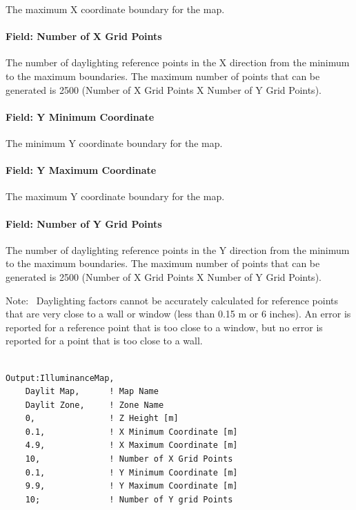 The maximum X coordinate boundary for the map.

\paragraph{Field: Number of X Grid Points}\label{field-number-of-x-grid-points}

The number of daylighting reference points in the X direction from the minimum to the maximum boundaries. The maximum number of points that can be generated is 2500 (Number of X Grid Points X Number of Y Grid Points).

\paragraph{Field: Y Minimum Coordinate}\label{field-y-minimum-coordinate}

The minimum Y coordinate boundary for the map.

\paragraph{Field: Y Maximum Coordinate}\label{field-y-maximum-coordinate}

The maximum Y coordinate boundary for the map.

\paragraph{Field: Number of Y Grid Points}\label{field-number-of-y-grid-points}

The number of daylighting reference points in the Y direction from the minimum to the maximum boundaries. The maximum number of points that can be generated is 2500 (Number of X Grid Points X Number of Y Grid Points).

Note:~ Daylighting factors cannot be accurately calculated for reference points that are very close to a wall or window (less than 0.15 m or 6 inches). An error is reported for a reference point that is too close to a window, but no error is reported for a point that is too close to a wall.

\begin{lstlisting}

Output:IlluminanceMap,
    Daylit Map,      ! Map Name
    Daylit Zone,     ! Zone Name
    0,               ! Z Height [m]
    0.1,             ! X Minimum Coordinate [m]
    4.9,             ! X Maximum Coordinate [m]
    10,              ! Number of X Grid Points
    0.1,             ! Y Minimum Coordinate [m]
    9.9,             ! Y Maximum Coordinate [m]
    10;              ! Number of Y grid Points
\end{lstlisting}

